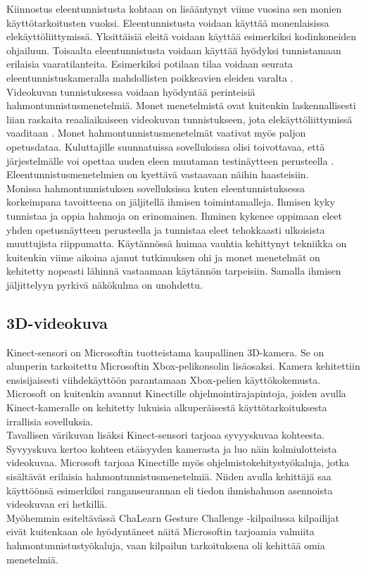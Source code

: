 Kiinnostus eleentunnistusta kohtaan on lisääntynyt viime vuosina sen monien käyttötarkoitusten vuoksi.
Eleentunnistusta voidaan käyttää monenlaisissa elekäyttöliittymissä. Yksittäisiä eleitä voidaan 
käyttää esimerkiksi kodinkoneiden ohjailuun. \citep {1251144} Toisaalta eleentunnistusta voidaan käyttää hyödyksi tunnistamaan
erilaisia vaaratilanteita. Esimerkiksi potilaan tilaa voidaan seurata eleentunnistuskameralla 
mahdollisten poikkeavien eleiden varalta \citep{chalearn2}.\\

Videokuvan tunnistuksessa voidaan hyödyntää perinteisiä hahmontunnistusmenetelmiä. Monet menetelmistä ovat kuitenkin laskennallisesti liian raskaita 
reaaliaikaiseen videokuvan tunnistukseen, jota elekäyttöliittymissä vaaditaan \citep {1251144}.
Monet hahmontunnistusmenetelmät vaativat myös paljon opetusdataa. Kuluttajille suunnatuissa
sovelluksissa olisi toivottavaa, että järjestelmälle voi opettaa uuden eleen muutaman testinäytteen perusteella \citep {1251144}.
Eleentunnistusmenetelmien on kyettävä vastaavaan näihin haasteisiin.\\

Monissa hahmontunnistuksen sovelluksissa kuten eleentunnistuksessa korkeimpana tavoitteena on jäljitellä ihmisen toimintamalleja.
Ihmisen kyky tunnistaa ja oppia hahmoja on erinomainen. Ihminen kykenee oppimaan eleet yhden opetusnäytteen perusteella 
ja tunnistaa eleet tehokkaasti ulkoisista muuttujista riippumatta. Käytännössä huimaa vauhtia kehittynyt tekniikka on kuitenkin
viime aikoina ajanut tutkimuksen ohi ja monet menetelmät on kehitetty nopeasti lähinnä vastaamaan käytännön tarpeisiin. Samalla 
ihmisen jäljittelyyn pyrkivä näkökulma on unohdettu. \citep{chalearn2}

\subsection{3D-videokuva}
Kinect-sensori on Microsoftin tuotteistama kaupallinen 3D-kamera. Se on alunperin tarkoitettu Microsoftin Xbox-pelikonsolin lisäosaksi.
Kamera kehitettiin ensisijaisesti viihdekäyttöön parantamaan Xbox-pelien käyttökokemusta. Microsoft on kuitenkin avannut
Kinectille ohjelmointirajapintoja, joiden avulla Kinect-kameralle on kehitetty lukuisia alkuperäisestä käyttötarkoituksesta 
irrallisia sovelluksia. \citep{kinect}\\

Tavallisen värikuvan lisäksi Kinect-sensori tarjoaa syvyyskuvaa kohteesta. Syvyyskuva kertoo kohteen etäisyyden kamerasta ja luo näin kolmiulotteista videokuvaa. 
Microsoft tarjoaa Kinectille myös ohjelmistokehitystyökaluja, jotka sisältävät erilaisia hahmontunnistusmenetelmiä.
Niiden avulla kehittäjä saa käyttöönsä esimerkiksi ranganseurannan eli tiedon ihmishahmon asennoista videokuvan eri hetkillä. \citep{kinect}\\
Myöhemmin esiteltävässä ChaLearn Gesture Challenge -kilpailussa kilpailijat eivät kuitenkaan ole hyödyntäneet näitä Microsoftin tarjoamia 
valmiita hahmontunnistustyökaluja, vaan kilpailun tarkoituksena oli kehittää omia menetelmiä. \\

